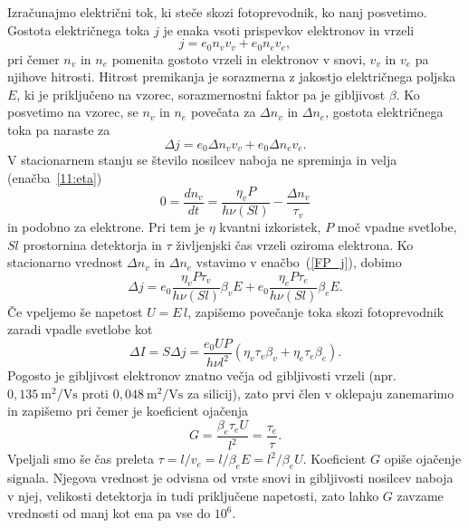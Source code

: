Izračunajmo električni tok, ki steče skozi fotoprevodnik, ko nanj posvetimo. 
Gostota električnega toka $j$ je enaka vsoti prispevkov elektronov 
 in vrzeli
\begin{equation}
j = e_0 n_v v_v + e_0 n_e v_e,
\end{equation}
pri čemer $n_v$ in $n_e$ pomenita gostoto vrzeli in elektronov v snovi, $v_v$ in $v_e$ pa 
njihove hitrosti. Hitrost premikanja 
je sorazmerna z jakostjo električnega poljska $E$, ki je priključeno
 na vzorec, sorazmernostni faktor pa je  gibljivost $\beta$. Ko posvetimo na vzorec, 
 se $n_v$ in $n_e$ povečata za $\Delta n_v$ in $\Delta n_e$,
gostota električnega toka pa naraste za
\begin{equation}
\Delta j = e_0 \Delta n_v v_v + e_0 \Delta n_e v_e.
\label{FP_j}
\end{equation}
V stacionarnem stanju se število nosilcev naboja ne spreminja in velja (enačba~\ref{11:eta})
\begin{equation}
0 = \frac{dn_v}{dt} = \frac{\eta_v P}{h \nu (Sl)} - \frac{\Delta n_v}{\tau_v}
\end{equation}
in podobno za elektrone. Pri tem je $\eta$ kvantni izkoristek, 
$P$ moč vpadne svetlobe,
$Sl$ prostornina detektorja in $\tau$ življenjski čas vrzeli oziroma elektrona. 
Ko stacionarno vrednost $\Delta n_v$ in $\Delta n_e$ vstavimo v enačbo~(\ref{FP_j}), dobimo
\begin{equation}
\Delta j = e_0 \frac{\eta_v P \tau_v}{h \nu (Sl)} \beta_v  E + 
e_0 \frac{\eta_e P \tau_e}{h \nu (Sl)} \beta_e  E.
\end{equation}
Če vpeljemo še napetost $U = E\,l$, zapišemo povečanje toka skozi fotoprevodnik zaradi 
vpadle svetlobe kot
\begin{equation}
\Delta I = S\Delta j = \frac{e_0 U P }{h \nu l^2} \left(\eta_v \tau_v \beta_v + 
\eta_e \tau_e \beta_e \right).
\end{equation}
Pogosto je gibljivost elektronov znatno večja od gibljivosti vrzeli (npr.
$0,135~\si{\meter}^2/\si{\volt\second}$ proti $0,048~\si{\meter}^2/\si{\volt\second}$ za silicij), 
 zato prvi člen v oklepaju zanemarimo in zapišemo
pri čemer je koeficient ojačenja 
\begin{equation}
G = \frac{\beta_e \tau_e U}{l^2} = \frac{\tau_e}{\tau}.
\end{equation}
Vpeljali smo še čas preleta $\tau = l/v_e = l/\beta_e E = l^2/\beta_e U$.
\newpage
Koeficient $G$ opiše ojačenje signala. Njegova vrednost je odvisna od 
vrste snovi in gibljivosti nosilcev naboja v njej, velikosti
detektorja in tudi priključene napetosti, zato lahko $G$ zavzame vrednosti od manj kot ena pa
vse do $10^6$. 

